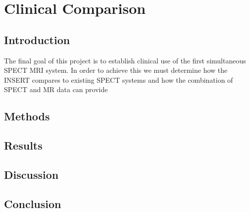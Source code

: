 \chapter{Clinical Comparison}
\label{chapterlabel}

\blindtext

\section{Introduction}
The final goal of this project is to establish clinical use of the first simultaneous SPECT MRI system. In order to achieve this we must determine how the INSERT compares to existing SPECT systems and how the combination of SPECT and MR data can provide 
\section{Methods}

\section{Results}

\section{Discussion}

\section{Conclusion}